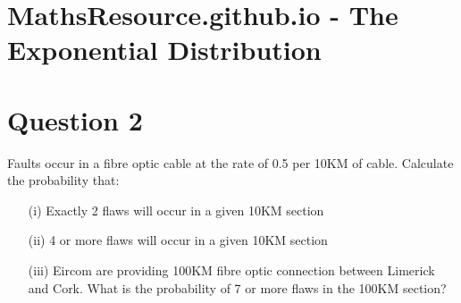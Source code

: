 \documentclass[]{report}
\begin{document}
\section*{MathsResource.github.io - The Exponential Distribution}	

\section*{Question 2}

Faults occur in a fibre optic cable at the rate of 0.5 per 10KM of cable.  Calculate the probability that:

\begin{itemize}
\item[(i)] Exactly 2 flaws will occur in a given 10KM section
\item[(ii)] 4 or more flaws will occur in a given 10KM section
\item[(iii)] Eircom are providing 100KM fibre optic connection between Limerick and Cork.  What is the probability of 7 or more flaws in the 100KM section?	
\end{itemize}				
\end{document}
